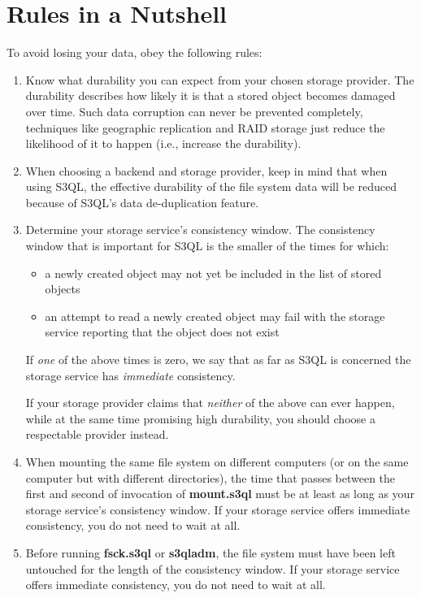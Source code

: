 \documentclass[letterpaper,10pt,english]{sphinxmanual}
\begin{document}
\section{Rules in a Nutshell}
\label{durability:rules-in-a-nutshell}
To avoid losing your data, obey the following rules:
\begin{enumerate}
\item {} 
Know what durability you can expect from your chosen storage
provider. The durability describes how likely it is that a stored
object becomes damaged over time. Such data corruption can never be
prevented completely, techniques like geographic replication and
RAID storage just reduce the likelihood of it to happen (i.e.,
increase the durability).

\item {} 
When choosing a backend and storage provider, keep in mind that
when using S3QL, the effective durability of the file system data
will be reduced because of S3QL's data de-duplication feature.

\item {} 
Determine your storage service's consistency window. The
consistency window that is important for S3QL is the smaller of the
times for which:
\begin{itemize}
\item {} 
a newly created object may not yet be included in the list of
stored objects

\item {} 
an attempt to read a newly created object may fail with the
storage service reporting that the object does not exist

\end{itemize}

If \emph{one} of the above times is zero, we say that as far as S3QL is
concerned the storage service has \emph{immediate} consistency.

If your storage provider claims that \emph{neither} of the above can
ever happen, while at the same time promising high durability, you
should choose a respectable provider instead.

\item {} 
When mounting the same file system on different computers (or on
the same computer but with different  directories),
the time that passes between the first and second of invocation of
\textbf{mount.s3ql} must be at least as long as your storage
service's consistency window. If your storage service offers
immediate consistency, you do not need to wait at all.

\item {} 
Before running \textbf{fsck.s3ql} or \textbf{s3qladm}, the file system
must have been left untouched for the length of the consistency
window. If your storage service offers immediate consistency, you
do not need to wait at all.

\end{enumerate}
\end{document}
